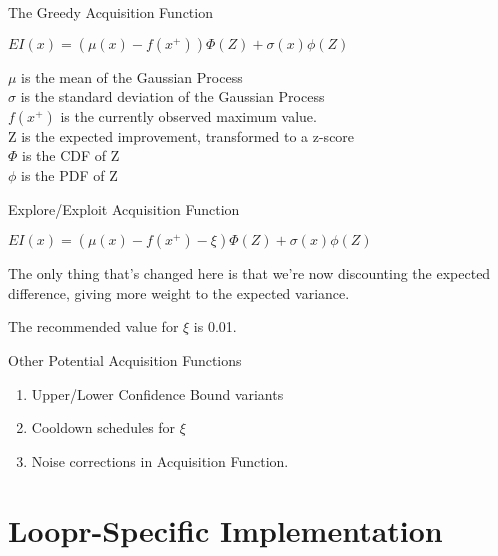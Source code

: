 \documentclass[10pt,ignorenonframetext,]{beamer}
\providecommand{\tightlist}{%
  \setlength{\itemsep}{0pt}\setlength{\parskip}{0pt}}
\begin{document}
\begin{frame}{The Greedy Acquisition Function}
\protect\hypertarget{the-greedy-acquisition-function}{}

\centering \(EI(x) = (\mu(x) - f(x^+))\Phi(Z) + \sigma(x)\phi(Z)\)

\vspace{15pt} \raggedright

\(\mu\) is the mean of the Gaussian Process\\
\(\sigma\) is the standard deviation of the Gaussian Process\\
\(f(x^+)\) is the currently observed maximum value.\\
Z is the expected improvement, transformed to a z-score\\
\(\Phi\) is the CDF of Z\\
\(\phi\) is the PDF of Z

\end{frame}

\begin{frame}{Explore/Exploit Acquisition Function}
\protect\hypertarget{exploreexploit-acquisition-function}{}

\centering \(EI(x) = (\mu(x) - f(x^+) - \xi)\Phi(Z) + \sigma(x)\phi(Z)\)

\vspace{15pt} \raggedright

The only thing that's changed here is that we're now discounting the
expected difference, giving more weight to the expected variance.

The recommended value for \(\xi\) is 0.01.

\end{frame}

\begin{frame}{Other Potential Acquisition Functions}
\protect\hypertarget{other-potential-acquisition-functions}{}

\begin{enumerate}
\tightlist
\item
  Upper/Lower Confidence Bound variants
\item
  Cooldown schedules for \(\xi\)
\item
  Noise corrections in Acquisition Function.
\end{enumerate}

\end{frame}

\hypertarget{loopr-specific-implementation}{%
\section{Loopr-Specific
Implementation}\label{loopr-specific-implementation}}
\end{document}
